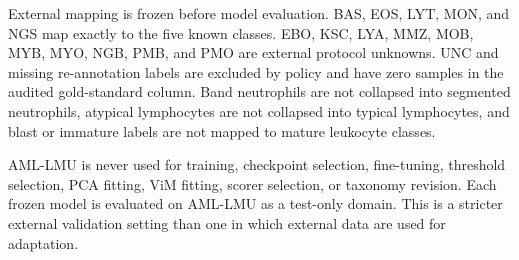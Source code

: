 External mapping is frozen before model evaluation. BAS, EOS, LYT, MON, and NGS map exactly to the five known classes. EBO, KSC, LYA, MMZ, MOB, MYB, MYO, NGB, PMB, and PMO are external protocol unknowns. UNC and missing re-annotation labels are excluded by policy and have zero samples in the audited gold-standard column. Band neutrophils are not collapsed into segmented neutrophils, atypical lymphocytes are not collapsed into typical lymphocytes, and blast or immature labels are not mapped to mature leukocyte classes.

AML-LMU is never used for training, checkpoint selection, fine-tuning, threshold selection, PCA fitting, ViM fitting, scorer selection, or taxonomy revision. Each frozen model is evaluated on AML-LMU as a test-only domain. This is a stricter external validation setting than one in which external data are used for adaptation.


